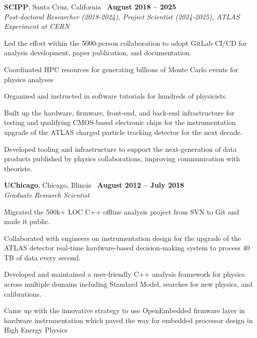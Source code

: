 \documentclass[margin,line]{resume}
\begin{document}
\begin{resume}
\textbf{SCIPP}, Santa Cruz, California \hfill \faCalendar\ \textbf{August 2018 -- 2025}\\
\textsl{Post-doctoral Researcher (2018-2024), Project Scientist (2024-2025), ATLAS Experiment at CERN}
\begin{list2}
  \small
  \item Led the effort within the 5000-person collaboration to adopt GitLab CI/CD for analysis development, paper publication, and documentation.
  \item Coordinated HPC resources for generating billions of Monte Carlo events for physics analyses
  \item Organized and instructed in software tutorials for hundreds of physicists.
  \item Built up the hardware, firmware, front-end, and back-end infrastructure for testing and qualifying CMOS-based electronic chips for the instrumentation upgrade of the ATLAS charged particle tracking detector for the next decade.
  \item Developed tooling and infrastructure to support the next-generation of data products published by physics collaborations, improving communication with theorists.
\end{list2}

\textbf{UChicago}, Chicago, Illinois \hfill \faCalendar\ \textbf{August 2012 -- July 2018}\\
\textsl{Graduate Research Scientist}
\begin{list2}
  \small
  \item Migrated the 500k+ LOC C++ offline analysis project from SVN to Git and made it public.
  \item Collaborated with engineers on instrumentation design for the upgrade of the ATLAS detector real-time hardware-based decision-making system to process 40 TB of data every second.
  \item Developed and maintained a user-friendly C++ analysis framework for physics across multiple domains including Standard Model, searches for new physics, and calibrations.
  \item Came up with the innovative strategy to use OpenEmbedded firmware layer in hardware instrumentation which paved the way for embedded processor design in High Energy Physics
\end{list2}


\end{resume}
\end{document}
